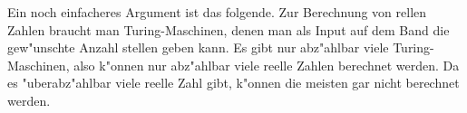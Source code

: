 {\begin{loesung}
Ein noch einfacheres Argument ist das folgende. Zur Berechnung von
rellen Zahlen braucht man Turing-Maschinen, denen man als Input auf
dem Band die gew"unschte Anzahl stellen geben kann. Es gibt nur
abz"ahlbar viele Turing-Maschinen, also k"onnen nur abz"ahlbar viele
reelle Zahlen berechnet werden. Da es "uberabz"ahlbar viele reelle
Zahl gibt, k"onnen die meisten gar nicht berechnet werden.
\end{loesung}

}{}

